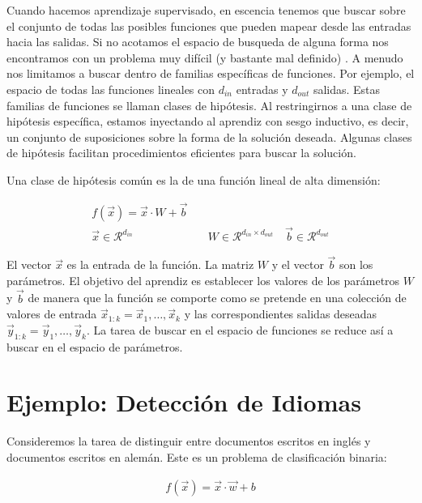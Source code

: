 
 Cuando hacemos aprendizaje supervisado, en escencia tenemos que buscar sobre el conjunto de todas las posibles funciones que pueden mapear desde las entradas hacia las salidas. Si no acotamos el espacio de busqueda de alguna forma nos encontramos con  un problema muy difícil (y bastante mal definido) \cite{goldberg2017neural}. A menudo nos limitamos a buscar dentro de familias específicas de funciones. Por ejemplo, el espacio de todas las funciones lineales con $d_{in}$ entradas y $d_{out}$ salidas. Estas familias de funciones se llaman clases de hipótesis. Al restringirnos a una clase de hipótesis específica, estamos inyectando al aprendiz con sesgo inductivo, es decir, un conjunto de suposiciones sobre la forma de la solución deseada. Algunas clases de hipótesis facilitan procedimientos eficientes para buscar la solución.

Una clase de hipótesis común es la de una función lineal de alta dimensión:

\begin{equation}
\begin{split}
f(\vec{x}) = \vec{x} \cdot W + \vec{b}\\
\vec{x} \in  \mathcal{R}^{d_{in}} & \quad W \in  \mathcal{R}^{d_{in}\times d_{out}} \quad \vec{b} \in  \mathcal{R}^{d_{out}}
\end{split}
\end{equation}

El vector $\vec{x}$ es la entrada de la función. La matriz $W$ y el vector $\vec{b}$ son los parámetros. El objetivo del aprendiz es establecer los valores de los parámetros $W$ y $\vec{b}$ de manera que la función se comporte como se pretende en una colección de valores de entrada $\vec{x}_{1:k} = \vec{x}_1,\dots,\vec{x}_k$ y las correspondientes salidas deseadas $\vec{y}_{1:k} = \vec{y}_1,\dots,\vec{y}_k$. La tarea de buscar en el espacio de funciones se reduce así a buscar en el espacio de parámetros.

\section{Ejemplo: Detección de Idiomas}

Consideremos la tarea de distinguir entre documentos escritos en inglés y documentos escritos en alemán. Este es un problema de clasificación binaria:

\begin{equation}
\begin{split}
f(\vec{x}) = \vec{x} \cdot \vec{w} + b
\end{split}
\end{equation}

